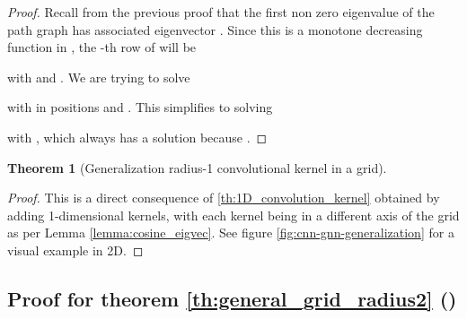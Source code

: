 \documentclass{article} \usepackage{arxiv,times}
\newtheorem{theorem}{Theorem}[section]
\begin{document}
\begin{proof}
Recall from the previous proof that the first non zero eigenvalue of the path graph  has associated eigenvector . Since this is a monotone decreasing function in , the -th row of  will be 

with  and . We are trying to solve 

with  in positions  and . This simplifies to solving

with , which always has a solution because . 
\end{proof}

\begin{theorem}[Generalization radius-1 convolutional kernel in a grid]
\label{th:general_grid_radius1}
\end{theorem}

\begin{proof}
This is a direct consequence of \ref{th:1D_convolution_kernel} obtained by adding  1-dimensional kernels, with each kernel being in a different axis of the grid as per Lemma \ref{lemma:cosine_eigvec}. See figure \ref{fig:cnn-gnn-generalization} for a visual example in 2D. 

\end{proof}


\subsection{Proof for theorem \ref{th:general_grid_radius2} ()}
\label{app:proof:general_grid_radius2}
\end{document}
